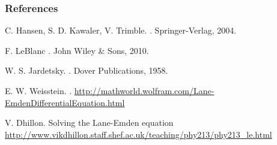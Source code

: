 \documentclass{beamer}
\begin{document}
        \begin{frame}[allowframebreaks]
            \frametitle{References}
            \begin{thebibliography}{10}

                \beamertemplatebookbibitems

                    C. Hansen, S. D. Kawaler, V. Trimble.
                    .
                    \newblock Springer-Verlag, 2004.

                    F. LeBlanc
                    .
                    \newblock John Wiley \& Sons, 2010.

                    W. S. Jardetsky.
                    .
                    \newblock Dover Publications, 1958.

                \beamertemplatearticlebibitems

                    E. W. Weisstein.
                    .
                    \newblock \url{http://mathworld.wolfram.com/Lane-EmdenDifferentialEquation.html}

                    V. Dhillon.
                    \newblock Solving the Lane-Emden equation
                    \newblock \url{http://www.vikdhillon.staff.shef.ac.uk/teaching/phy213/phy213\_le.html}


            \end{thebibliography}

        \end{frame}
\end{document}
